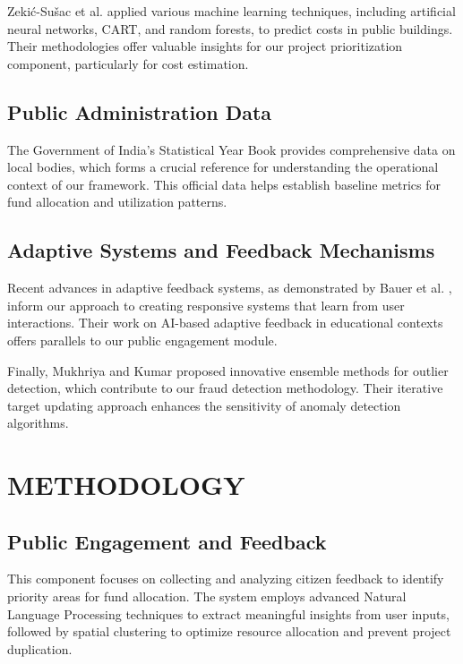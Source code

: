 \documentclass[12pt,a4paper]{report}
\begin{document}
\noindent Zekić-Sušac et al. \cite{zekic2021} applied various machine learning techniques, including artificial neural networks, CART, and random forests, to predict costs in public buildings. Their methodologies offer valuable insights for our project prioritization component, particularly for cost estimation.

\section{Public Administration Data}
\indent \indent The Government of India's Statistical Year Book \cite{govt2024} provides comprehensive data on local bodies, which forms a crucial reference for understanding the operational context of our framework. This official data helps establish baseline metrics for fund allocation and utilization patterns.

\section{Adaptive Systems and Feedback Mechanisms}
\indent \indent Recent advances in adaptive feedback systems, as demonstrated by Bauer et al. \cite{bauer2025}, inform our approach to creating responsive systems that learn from user interactions. Their work on AI-based adaptive feedback in educational contexts offers parallels to our public engagement module.

\noindent Finally, Mukhriya and Kumar \cite{mukhriya2025} proposed innovative ensemble methods for outlier detection, which contribute to our fraud detection methodology. Their iterative target updating approach enhances the sensitivity of anomaly detection algorithms.

\chapter{METHODOLOGY}

\section{Public Engagement and Feedback}
\indent \indent This component focuses on collecting and analyzing citizen feedback to identify priority areas for fund allocation. The system employs advanced Natural Language Processing techniques to extract meaningful insights from user inputs, followed by spatial clustering to optimize resource allocation and prevent project duplication.
\end{document}
